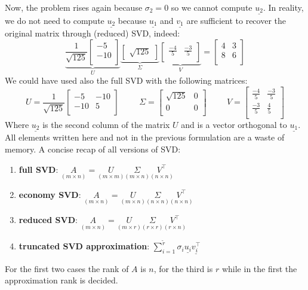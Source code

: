 Now, the problem rises again because $\sigma_2 = 0$ so we cannot compute $\underline{u_2}$. In reality, we do not need to compute $\underline{u_2}$ because $\underline{u_1}$ and $\underline{v_1}$ are sufficient to recover the original matrix through (reduced) SVD, indeed:
\[
\underbrace{
\dfrac{1}{\sqrt{125}} \begin{bmatrix}
    -5 \\
    -10\\
\end{bmatrix}}_{U}
\underbrace{
\begin{bmatrix}
    \sqrt{125}
\end{bmatrix}}_{\Sigma}
\underbrace{ 
\begin{bmatrix}
    \frac{-4}{5} & \frac{-3}{5}\\
\end{bmatrix}}_{V}   
=
\begin{bmatrix}
    4 & 3\\
    8 & 6\\
\end{bmatrix}
\] 
We could have used also the full SVD with the following matrices:
\[
    U = \dfrac{1}{\sqrt{125}} \begin{bmatrix}
        -5 & -10\\
        -10 & 5\\
    \end{bmatrix}
\hspace{1cm}
\Sigma = \begin{bmatrix}
    \sqrt{125} & 0\\
    0 & 0\\
\end{bmatrix}
\hspace{1cm}
V = \begin{bmatrix}
    \frac{-4}{5} & \frac{-3}{5}\\
    \frac{-3}{5} & \frac{4}{5}\\
\end{bmatrix}
\]
Where $\underline{u_2}$ is the second column of the matrix $U$ and is a vector orthogonal to $\underline{u_1}$. All elements written here and not in the previous formulation are a waste of memory.
A concise recap of all versions of SVD:
\begin{enumerate}
    \item \textbf{full SVD}: $\underset{(m \times n)}{A} = \underset{(m \times m)}{U}\underset{(m \times n)}{\Sigma}\underset{(n \times n)}{V^\intercal}$
    \item \textbf{economy SVD}: $\underset{(m \times n)}{A} = \underset {(m \times n)}{U}\underset{(n \times n)}{\Sigma}\underset{(n \times n)}{V^\intercal}$
    \item \textbf{reduced SVD}: $\underset{(m \times n)}{A} = \underset{(m \times r)}{U}\underset{(r \times r)}{\Sigma}\underset{(r \times n)}{V^\intercal}$
    \item \textbf{truncated SVD approximation}: $\sum\limits_{i=1}^{\tilde{r}} \sigma_i\underline{u_i}\underline{v_i^\intercal}$
\end{enumerate}
For the first two cases the rank of $A$ is $n$, for the third is $r$ while in the first the approximation rank is decided.

